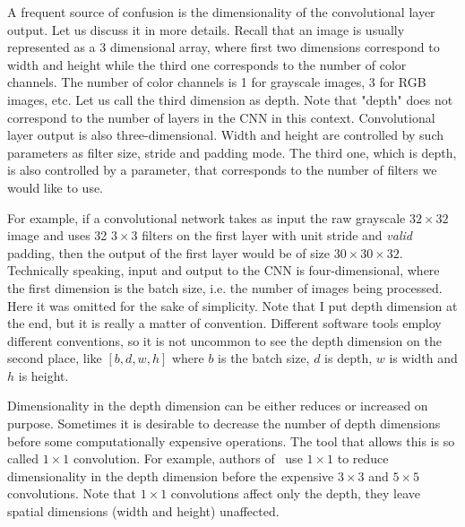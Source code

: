 \documentclass[a4paper, 11pt, table]{article}
\begin{document}
A frequent source of confusion is the dimensionality of the convolutional layer output. Let us discuss it in more details. Recall that an image is usually represented as a 3 dimensional array, where first two dimensions correspond to width and height while the third one corresponds to the number of color channels. The number of color channels is 1 for grayscale images, 3 for RGB images, etc. Let us call the third dimension as depth. Note that "depth" does not correspond to the number of layers in the CNN in this context. Convolutional layer output is also three-dimensional. Width and height are controlled by  such parameters as filter size, stride and padding mode. The third one, which is depth, is also controlled by a parameter, that corresponds to the number of filters we would like to use.

For example, if a convolutional network takes as input the raw grayscale $32 \times 32$ image and uses 32 $3 \times 3$ filters on the first layer with unit stride and \textit{valid} padding, then the output of the first layer would be of size $30 \times 30 \times 32$. Technically speaking, input and output to the CNN is four-dimensional, where the first dimension is the batch size, i.e. the number of images being processed. Here it was omitted for the sake of simplicity. Note that I put depth dimension at the end, but it is really a matter of convention. Different software tools employ different conventions, so it is not uncommon to see the depth dimension on the second place, like $[b, d, w, h]$ where $b$ is the batch size, $d$ is depth, $w$ is width and $h$ is height. 

Dimensionality in the depth dimension can be either reduces or increased on purpose. Sometimes it is desirable to decrease the number of depth dimensions before some computationally expensive operations. The tool that allows this is so called $1 \times 1$ convolution. For example, authors of~\cite{DBLP:journals/corr/SzegedyLJSRAEVR14} use   $1 \times 1$ to reduce dimensionality in the depth dimension before the expensive $3 \times 3$ and $5 \times 5$ convolutions. Note that $1 \times 1$ convolutions affect only the depth, they leave spatial dimensions (width and height) unaffected.
\end{document}
